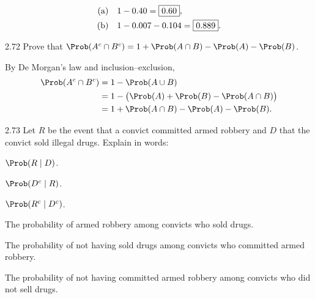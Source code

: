 \documentclass[11pt,oneside]{article}
\begin{document}
\begin{solution}
\begin{align*}
\textup{(a)}\quad&1-0.40=\boxed{0.60},\\
\textup{(b)}\quad&1-0.007-0.104=\boxed{0.889}.
\end{align*}
\end{solution}

\begin{exercise}{2.72}
Prove that $\Prob(A^c\cap B^c)=1+\Prob(A\cap B)-\Prob(A)-\Prob(B)$.
\end{exercise}

\begin{solution}
By De Morgan's law and inclusion--exclusion,
\[
\begin{aligned}
\Prob(A^c\cap B^c)&=1-\Prob(A\cup B)\\
&=1-\bigl(\Prob(A)+\Prob(B)-\Prob(A\cap B)\bigr)\\
&=1+\Prob(A\cap B)-\Prob(A)-\Prob(B).
\end{aligned}
\]
\end{solution}

\begin{exercise}{2.73}
Let $R$ be the event that a convict committed armed robbery and $D$ that the convict sold illegal drugs. Explain in words:
\begin{exercisesubparts}
\item $\Prob(R\mid D)$.
\item $\Prob(D^c\mid R)$.
\item $\Prob(R^c\mid D^c)$.
\end{exercisesubparts}
\end{exercise}

\begin{solution}
\begin{exercisesubparts}
\item The probability of armed robbery among convicts who sold drugs.
\item The probability of not having sold drugs among convicts who committed armed robbery.
\item The probability of not having committed armed robbery among convicts who did not sell drugs.
\end{exercisesubparts}
\end{solution}
\end{document}
